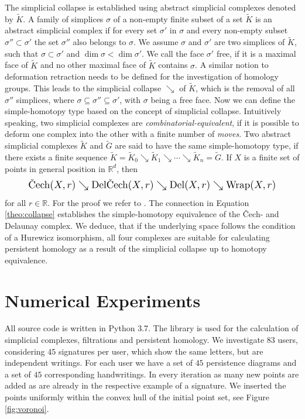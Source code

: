 \documentclass{article}
\begin{document}
The simplicial collapse is established using abstract simplicial complexes denoted by $\tilde{K}$. A family of simplices $\sigma$ of a non-empty finite subset of a set $\tilde{K}$ is an abstract simplicial complex if for every set $\sigma'$ in $\sigma$ and every non-empty subset $\sigma'' \subset \sigma'$ the set $\sigma''$ also belongs to $\sigma$. We assume $\sigma$ and $\sigma'$ are two simplices of $\tilde{K}$, such that $\sigma \subset \sigma'$ and $\dim \sigma < \dim \sigma'$. We call the face $\sigma'$ free, if it is a maximal face of $\tilde{K}$ and no other maximal face of $\tilde{K}$ contains $\sigma$. A similar notion to deformation retraction needs to be defined for the investigation of homology groups. This leads to the simplicial collapse $\searrow$ of $\tilde{K}$, which is the removal of all $\sigma''$ simplices, where $\sigma \subseteq \sigma'' \subseteq \sigma'$, with $\sigma$ being a free face. Now we can define the simple-homotopy type based on the concept of simplicial collapse. Intuitively speaking, two simplicial complexes are \textit{combinatorial-equivalent}, if it is possible to deform one complex into the other with a finite number of \textit{moves}.  Two abstract simplicial complexes $\tilde{K}$ and $\tilde{G}$ are said to have the same simple-homotopy type, if there exists a finite sequence $\tilde{K}=\tilde{K}_0 \searrow \tilde{K}_1 \searrow \cdots \searrow \tilde{K}_n = \tilde{G}$. If $X$ is a finite set of points in general position in $\mathbb{R}^d$, then
\begin{equation}
\label{theo:collapse}
\resizebox{0.88\columnwidth}{!}
{$\text{\v{C}ech}(X,r) \searrow \text{Del\v{C}ech}(X,r) \searrow \text{Del}(X,r) \searrow \text{Wrap}(X,r)$}
\end{equation}
for all $r \in \mathbb{R}$. For the proof we refer to \cite{bauer2017morse}. The connection in Equation \ref{theo:collapse} establishes the simple-homotopy equivalence of the \v{C}ech- and Delaunay complex. We deduce, that if the underlying space follows the condition of a Hurewicz isomorphism, all four complexes are suitable for calculating persistent homology as a result of the simplicial collapse up to homotopy equivalence.

\section{Numerical Experiments}
\label{sec:numexp}
All source code is written in Python 3.7. The \cite{gudhi:urm} library is used for the calculation of simplicial complexes, filtrations and persistent homology. We investigate $83$ users, considering $45$ signatures per user, which show the same letters, but are independent writings. For each user we have a set of $45$ persistence diagrams and a set of $45$ corresponding handwritings. In every iteration as many new points are added as are already in the respective example of a signature. We inserted the points uniformly within the convex hull of the initial point set, see Figure \ref{fig:voronoi}.
\end{document}
